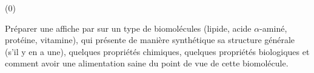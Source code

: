 \begin{programmeSeance}[2](0)
\end{programmeSeance}


\begin{tacheFinale}
  Préparer une affiche par  sur un type de biomolécules (lipide, acide $\alpha$-aminé, protéine, vitamine), qui présente de manière synthétique sa structure générale (s'il y en a une), quelques propriétés chimiques, quelques propriétés biologiques et comment avoir une alimentation saine du point de vue de cette biomolécule.
\end{tacheFinale}


